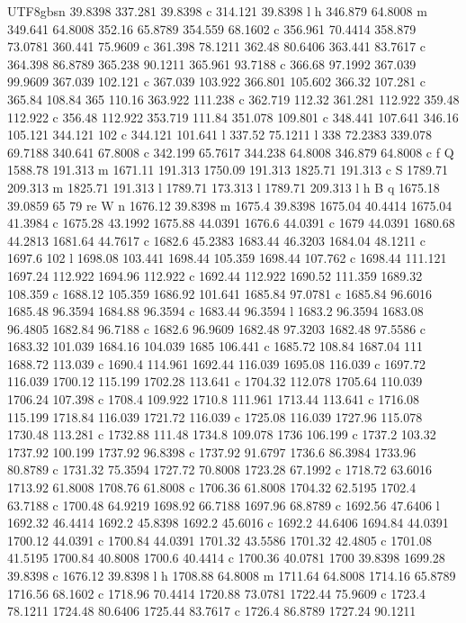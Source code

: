 \documentclass[11pt,a4paper,oneside]{report}
\begin{document}
\begin{CJK*}{UTF8}{gbsn}
{39.8398 337.281 39.8398 c 314.121 39.8398 l h 346.879 64.8008 m 349.641 64.8008 352.16 65.8789 354.559
68.1602 c 356.961 70.4414 358.879 73.0781 360.441 75.9609 c 361.398 78.1211 362.48 80.6406 363.441
83.7617 c 364.398 86.8789 365.238 90.1211 365.961 93.7188 c 366.68 97.1992 367.039 99.9609 367.039
102.121 c 367.039 103.922 366.801 105.602 366.32 107.281 c 365.84 108.84 365 110.16 363.922 111.238 c
362.719 112.32 361.281 112.922 359.48 112.922 c 356.48 112.922 353.719 111.84 351.078 109.801 c 348.441
107.641 346.16 105.121 344.121 102 c 344.121 101.641 l 337.52 75.1211 l 338 72.2383 339.078 69.7188
340.641 67.8008 c 342.199 65.7617 344.238 64.8008 346.879 64.8008 c f Q 1588.78 191.313 m 1671.11 191.313
1750.09 191.313 1825.71 191.313 c S 1789.71 209.313 m 1825.71 191.313 l 1789.71 173.313 l 1789.71 209.313
l h B q 1675.18 39.0859 65 79 re W n 1676.12 39.8398 m 1675.4 39.8398 1675.04 40.4414 1675.04 41.3984 c
1675.28 43.1992 1675.88 44.0391 1676.6 44.0391 c 1679 44.0391 1680.68 44.2813 1681.64 44.7617 c 1682.6
45.2383 1683.44 46.3203 1684.04 48.1211 c 1697.6 102 l 1698.08 103.441 1698.44 105.359 1698.44 107.762 c
1698.44 111.121 1697.24 112.922 1694.96 112.922 c 1692.44 112.922 1690.52 111.359 1689.32 108.359 c
1688.12 105.359 1686.92 101.641 1685.84 97.0781 c 1685.84 96.6016 1685.48 96.3594 1684.88 96.3594 c
1683.44 96.3594 l 1683.2 96.3594 1683.08 96.4805 1682.84 96.7188 c 1682.6 96.9609 1682.48 97.3203 1682.48
97.5586 c 1683.32 101.039 1684.16 104.039 1685 106.441 c 1685.72 108.84 1687.04 111 1688.72 113.039 c
1690.4 114.961 1692.44 116.039 1695.08 116.039 c 1697.72 116.039 1700.12 115.199 1702.28 113.641 c
1704.32 112.078 1705.64 110.039 1706.24 107.398 c 1708.4 109.922 1710.8 111.961 1713.44 113.641 c 1716.08
115.199 1718.84 116.039 1721.72 116.039 c 1725.08 116.039 1727.96 115.078 1730.48 113.281 c 1732.88
111.48 1734.8 109.078 1736 106.199 c 1737.2 103.32 1737.92 100.199 1737.92 96.8398 c 1737.92 91.6797
1736.6 86.3984 1733.96 80.8789 c 1731.32 75.3594 1727.72 70.8008 1723.28 67.1992 c 1718.72 63.6016
1713.92 61.8008 1708.76 61.8008 c 1706.36 61.8008 1704.32 62.5195 1702.4 63.7188 c 1700.48 64.9219
1698.92 66.7188 1697.96 68.8789 c 1692.56 47.6406 l 1692.32 46.4414 1692.2 45.8398 1692.2 45.6016 c
1692.2 44.6406 1694.84 44.0391 1700.12 44.0391 c 1700.84 44.0391 1701.32 43.5586 1701.32 42.4805 c
1701.08 41.5195 1700.84 40.8008 1700.6 40.4414 c 1700.36 40.0781 1700 39.8398 1699.28 39.8398 c 1676.12
39.8398 l h 1708.88 64.8008 m 1711.64 64.8008 1714.16 65.8789 1716.56 68.1602 c 1718.96 70.4414 1720.88
73.0781 1722.44 75.9609 c 1723.4 78.1211 1724.48 80.6406 1725.44 83.7617 c 1726.4 86.8789 1727.24 90.1211
}
\end{CJK*}
\end{document}
